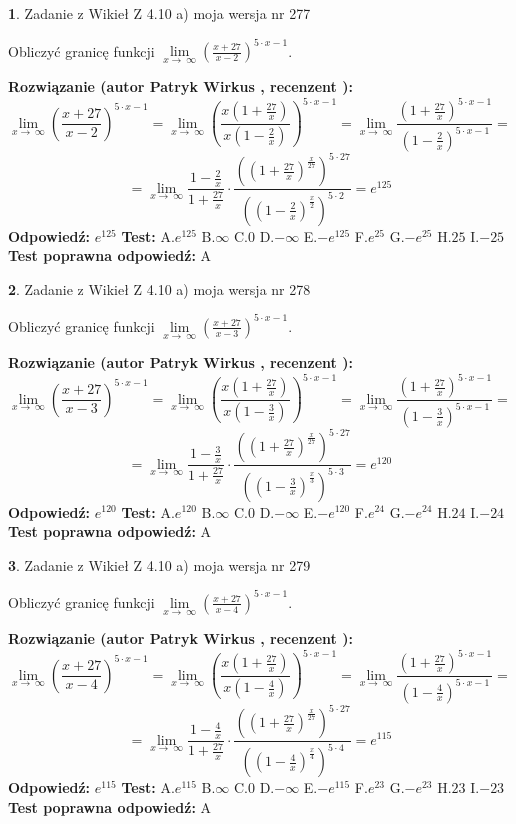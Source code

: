\documentclass[12pt, a4paper]{article}
\theoremstyle{definition} %
\newtheorem{zad}{}
\newcommand{\zadStart}[1]{\begin{zad}#1\newline}
\newcommand{\zadStop}{\end{zad}}
\newcommand{\rozwStart}[2]{\noindent \textbf{Rozwiązanie (autor #1 , recenzent #2): }\newline}
\newcommand{\rozwStop}{\newline}
\newcommand{\odpStart}{\noindent \textbf{Odpowiedź:}\newline}
\newcommand{\odpStop}{\newline}
\newcommand{\testStart}{\noindent \textbf{Test:}\newline}
\newcommand{\testStop}{\newline}
\newcommand{\kluczStart}{\noindent \textbf{Test poprawna odpowiedź:}\newline}
\newcommand{\kluczStop}{\newline}
\begin{document}
\zadStart{Zadanie z Wikieł Z 4.10 a) moja wersja nr 277}

Obliczyć granicę funkcji  $\lim\limits_{x\to\ \infty}(\frac{x+27}{x-2})^{5\cdot x-1}$.
\zadStop
\rozwStart{Patryk Wirkus}{}
$$\lim\limits_{x\to\ \infty}(\frac{x+27}{x-2})^{5\cdot x-1} = \lim\limits_{x\to\ \infty}(\frac{x(1+\frac{27}{x})}{x(1-\frac{2}{x})})^{5\cdot x-1}=\lim\limits_{x\to\ \infty}\frac{(1+\frac{27}{x})^{5\cdot x-1}}{(1-\frac{2}{x})^{5\cdot x-1}}=$$
$$=\lim\limits_{x\to\ \infty}\frac{1-\frac{2}{x}}{1+\frac{27}{x}}\cdot\frac{((1+\frac{27}{x})^{\frac{x}{27}})^{5\cdot27}}{((1-\frac{2}{x})^{\frac{x}{2}})^{5\cdot2}}=e^{125}$$
\rozwStop
\odpStart
$e^{125}$
\odpStop
\testStart
A.$e^{125}$ B.$\infty$ C.$0$ D.$-\infty$ E.$-e^{125}$
F.$e^{25}$ G.$-e^{25}$
H.$25$
I.$-25$
\testStop
\kluczStart
A
\kluczStop



\zadStart{Zadanie z Wikieł Z 4.10 a) moja wersja nr 278}

Obliczyć granicę funkcji  $\lim\limits_{x\to\ \infty}(\frac{x+27}{x-3})^{5\cdot x-1}$.
\zadStop
\rozwStart{Patryk Wirkus}{}
$$\lim\limits_{x\to\ \infty}(\frac{x+27}{x-3})^{5\cdot x-1} = \lim\limits_{x\to\ \infty}(\frac{x(1+\frac{27}{x})}{x(1-\frac{3}{x})})^{5\cdot x-1}=\lim\limits_{x\to\ \infty}\frac{(1+\frac{27}{x})^{5\cdot x-1}}{(1-\frac{3}{x})^{5\cdot x-1}}=$$
$$=\lim\limits_{x\to\ \infty}\frac{1-\frac{3}{x}}{1+\frac{27}{x}}\cdot\frac{((1+\frac{27}{x})^{\frac{x}{27}})^{5\cdot27}}{((1-\frac{3}{x})^{\frac{x}{3}})^{5\cdot3}}=e^{120}$$
\rozwStop
\odpStart
$e^{120}$
\odpStop
\testStart
A.$e^{120}$ B.$\infty$ C.$0$ D.$-\infty$ E.$-e^{120}$
F.$e^{24}$ G.$-e^{24}$
H.$24$
I.$-24$
\testStop
\kluczStart
A
\kluczStop



\zadStart{Zadanie z Wikieł Z 4.10 a) moja wersja nr 279}

Obliczyć granicę funkcji  $\lim\limits_{x\to\ \infty}(\frac{x+27}{x-4})^{5\cdot x-1}$.
\zadStop
\rozwStart{Patryk Wirkus}{}
$$\lim\limits_{x\to\ \infty}(\frac{x+27}{x-4})^{5\cdot x-1} = \lim\limits_{x\to\ \infty}(\frac{x(1+\frac{27}{x})}{x(1-\frac{4}{x})})^{5\cdot x-1}=\lim\limits_{x\to\ \infty}\frac{(1+\frac{27}{x})^{5\cdot x-1}}{(1-\frac{4}{x})^{5\cdot x-1}}=$$
$$=\lim\limits_{x\to\ \infty}\frac{1-\frac{4}{x}}{1+\frac{27}{x}}\cdot\frac{((1+\frac{27}{x})^{\frac{x}{27}})^{5\cdot27}}{((1-\frac{4}{x})^{\frac{x}{4}})^{5\cdot4}}=e^{115}$$
\rozwStop
\odpStart
$e^{115}$
\odpStop
\testStart
A.$e^{115}$ B.$\infty$ C.$0$ D.$-\infty$ E.$-e^{115}$
F.$e^{23}$ G.$-e^{23}$
H.$23$
I.$-23$
\testStop
\kluczStart
A
\kluczStop
\end{document}
